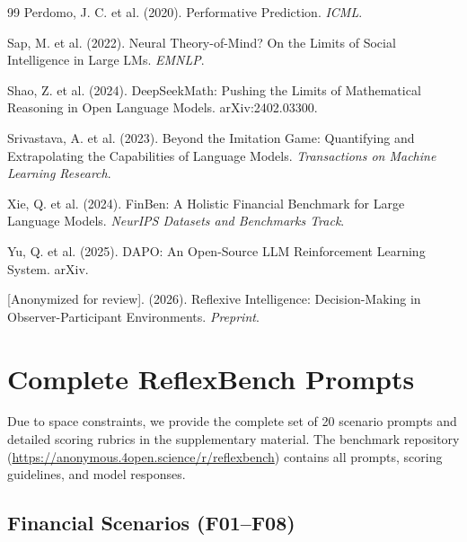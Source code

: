 \documentclass{article}
\begin{document}
\begin{thebibliography}{99}
Perdomo, J. C. et al. (2020).
Performative Prediction.
\textit{ICML}.

Sap, M. et al. (2022).
Neural Theory-of-Mind? On the Limits of Social Intelligence in Large LMs.
\textit{EMNLP}.

Shao, Z. et al. (2024).
DeepSeekMath: Pushing the Limits of Mathematical Reasoning in Open Language Models.
arXiv:2402.03300.

Srivastava, A. et al. (2023).
Beyond the Imitation Game: Quantifying and Extrapolating the Capabilities of Language Models.
\textit{Transactions on Machine Learning Research}.

Xie, Q. et al. (2024).
FinBen: A Holistic Financial Benchmark for Large Language Models.
\textit{NeurIPS Datasets and Benchmarks Track}.

Yu, Q. et al. (2025).
DAPO: An Open-Source LLM Reinforcement Learning System.
arXiv.

[Anonymized for review]. (2026).
Reflexive Intelligence: Decision-Making in Observer-Participant Environments.
\textit{Preprint}.

\end{thebibliography}

\appendix
\section{Complete ReflexBench Prompts}
\label{app:prompts}

Due to space constraints, we provide the complete set of 20 scenario prompts and detailed scoring rubrics in the supplementary material. The benchmark repository (\url{https://anonymous.4open.science/r/reflexbench}) contains all prompts, scoring guidelines, and model responses.

\subsection{Financial Scenarios (F01--F08)}
\end{document}
